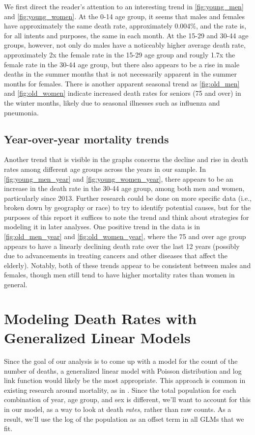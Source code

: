 \documentclass[11pt]{article}
\begin{document}
We first direct the reader's attention to an interesting trend in \cref{fig:young_men} and \cref{fig:young_women}.
At the 0-14 age group, it seems that males and females have approximately the same death rate, approximately 0.004\%, and the rate is, for all intents and purposes, the same in each month. 
At the 15-29 and 30-44 age groups, however, not only do males have a noticeably higher average death rate, approximately 2x the female rate in the 15-29 age group and rougly 1.7x the female rate in the 30-44 age group, but there also appears to be a rise in male deaths in the summer months that is not necessarily apparent in the summer months for females.
There is another apparent seasonal trend as \cref{fig:old_men} and \cref{fig:old_women} indicate increased death rates for seniors (75 and over) in the winter months, likely due to seasonal illnesses such as influenza and pneumonia.

\subsection{Year-over-year mortality trends}\label{sec:age_year}

Another trend that is visible in the graphs concerns the decline and rise in death rates among different age groups across the years in our sample.
In \cref{fig:young_men_year} and \cref{fig:young_women_year}, there appears to be an increase in the death rate in the 30-44 age group, among both men and women, particularly since 2013.
Further research could be done on more specific data (i.e., broken down by geography or race) to try to identify potential causes, but for the purposes of this report it suffices to note the trend and think about strategies for modeling it in later analyses.
One positive trend in the data is in \cref{fig:old_men_year} and \cref{fig:old_women_year}, where the 75 and over age group appears to have a linearly declining death rate over the last 12 years (possibly due to advancements in treating cancers and other diseases that affect the elderly).
Notably, both of these trends appear to be consistent between males and females, though men still tend to have higher mortality rates than women in general.


\section{Modeling Death Rates with Generalized Linear Models}\label{sec:glms}

Since the goal of our analysis is to come up with a model for the count of the number of deaths, a generalized linear model with Poisson distribution and log link function would likely be the most appropriate.
This approach is common in existing research around mortality, as in \cite{strumpf2017}.
Since the total population for each combination of year, age group, and sex is different, we'll want to account for this in our model, as a way to look at death \textit{rates}, rather than raw counts.
As a result, we'll use the log of the population as an offset term in all GLMs that we fit\cite{agresti_2019}.
\end{document}

